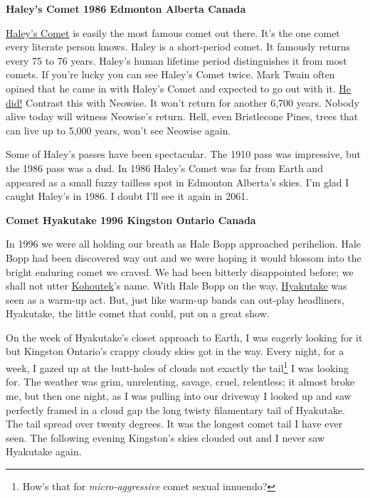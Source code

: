 \medskip

\noindent \textbf{Haley's Comet 1986 Edmonton Alberta Canada}

\medskip

\href{https://en.wikipedia.org/wiki/Halley's_Comet}{Haley's Comet} is
easily the most famous comet out there. It's the one comet every
literate person knows. Haley is a short-period comet. It famously
returns every 75 to 76 years. Haley's human lifetime period
distinguishes it from most comets. If you're lucky you can see Haley's
Comet twice. Mark Twain often opined that he came in with Haley's Comet
and expected to go out with it.
\href{http://www.todayifoundout.com/index.php/2013/10/samuel-clemens-born-died-year-halleys-comet/}{He
did!} Contrast this with Neowise. It won't return for another 6,700
years. Nobody alive today will witness Neowise's return. Hell, even
Bristlecone Pines, trees that can live up to 5,000 years, won't see
Neowise again.

Some of Haley's passes have been spectacular. The 1910 pass was
impressive, but the 1986 pass was a dud. In 1986 Haley's Comet was far
from Earth and appeared as a small fuzzy tailless spot in Edmonton
Alberta's skies. I'm glad I caught Haley's in 1986. I doubt I'll see it
again in 2061.

\medskip

\noindent \textbf{Comet Hyakutake 1996 Kingston Ontario Canada}

\medskip

In 1996 we were all holding our breath as Hale Bopp approached
perihelion. Hale Bopp had been discovered way out and we were hoping it
would blossom into the bright enduring comet we craved. We had been
bitterly disappointed before; we shall not utter
\href{https://en.wikipedia.org/wiki/Comet_Kohoutek}{Kohoutek}'s name.
With Hale Bopp on the way,
\href{https://en.wikipedia.org/wiki/Comet_Hyakutake}{Hyakutake} was seen
as a warm-up act. But, just like warm-up bands can out-play headliners,
Hyakutake, the little comet that could, put on a great show.

On the week of Hyakutake's closet approach to Earth, I was eagerly
looking for it but Kingston Ontario's crappy cloudy skies got in the
way. Every night, for a week, I gazed up at the butt-holes of clouds not
exactly the tail\footnote{How's that for \emph{micro-aggressive} comet sexual
 innuendo? } I was
looking for. The weather was grim, unrelenting, savage, cruel,
relentless; it almost broke me, but then one night, as I was pulling
into our driveway I looked up and saw perfectly framed in a cloud gap
the long twisty filamentary tail of Hyakutake. The tail spread over
twenty degrees. It was the longest comet tail I have ever seen. The
following evening Kingston's skies clouded out and I never saw Hyakutake
again.

